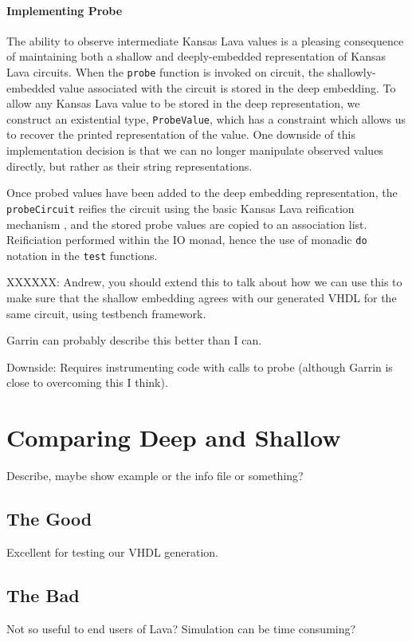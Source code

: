 \documentclass{llncs}
\begin{document}
\paragraph{Implementing Probe}

The ability to observe intermediate Kansas Lava values is a pleasing consequence
of maintaining both a shallow and deeply-embedded representation of Kansas Lava
circuits. When the \verb!probe! function is invoked on circuit, the
shallowly-embedded value associated with the circuit is stored in the deep
embedding. To allow any Kansas Lava value to be stored in the deep
representation, we construct an existential type, \verb!ProbeValue!, which has a
constraint which allows us to recover the printed representation of the
value. One downside of this implementation decision is that we can no longer
manipulate observed values directly, but rather as their string representations.

Once probed values have been added to the deep embedding representation, the
\verb!probeCircuit! reifies the circuit using the basic Kansas Lava reification
mechanism \cite{}, and the stored probe values are copied to an association
list. Reificiation performed within the IO monad, hence the use of monadic \verb!do!
notation in the \verb!test! functions.

XXXXXX: Andrew, you should extend this to talk about how we can use this to
make sure that the shallow embedding agrees with our generated VHDL for the same
circuit, using testbench framework.


Garrin can probably describe this better than I can.

Downside: Requires instrumenting code with calls to probe (although Garrin is close to
overcoming this I think).

\section{Comparing Deep and Shallow}

Describe, maybe show example or the info file or something?

\subsection{The Good}

Excellent for testing our VHDL generation.

\subsection{The Bad}

Not so useful to end users of Lava? Simulation can be time consuming?

\end{document}
